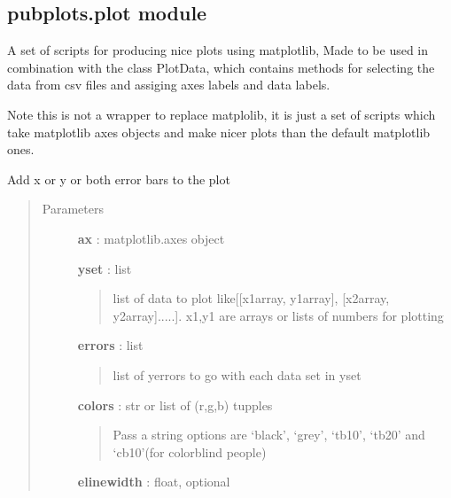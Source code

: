 \documentclass[letterpaper,10pt,english]{sphinxmanual}
\begin{document}
\subsection{pubplots.plot module}
\label{pubplots:module-pubplots.plot}\label{pubplots:pubplots-plot-module}
A set of scripts for producing nice plots using matplotlib,
Made to be used in combination with the class PlotData, which contains methods
for selecting the data from csv files and assiging axes labels and data labels.

Note this is not a wrapper to replace matplolib, it is just a set of scripts
which take matplotlib axes objects and make nicer plots than the default matplotlib ones.

\begin{fulllineitems}
\label{pubplots:pubplots.plot.add_yerrors}
Add x or y or both error bars to the plot
\begin{quote}\begin{description}
\item[{Parameters}] \leavevmode
\textbf{ax} : matplotlib.axes object

\textbf{yset} : list
\begin{quote}

list of data to plot like{[}{[}x1array, y1array{]}, {[}x2array, y2array{]}.....{]}.
x1,y1 are arrays or lists of numbers for plotting
\end{quote}

\textbf{errors} : list
\begin{quote}

list of yerrors to go with each data set in yset
\end{quote}

\textbf{colors} : str or list of (r,g,b) tupples
\begin{quote}

Pass a string options are `black', `grey', `tb10', `tb20' and `cb10'(for colorblind people)
\end{quote}

\textbf{elinewidth} : float, optional

\end{description}\end{quote}

\end{fulllineitems}
\end{document}
